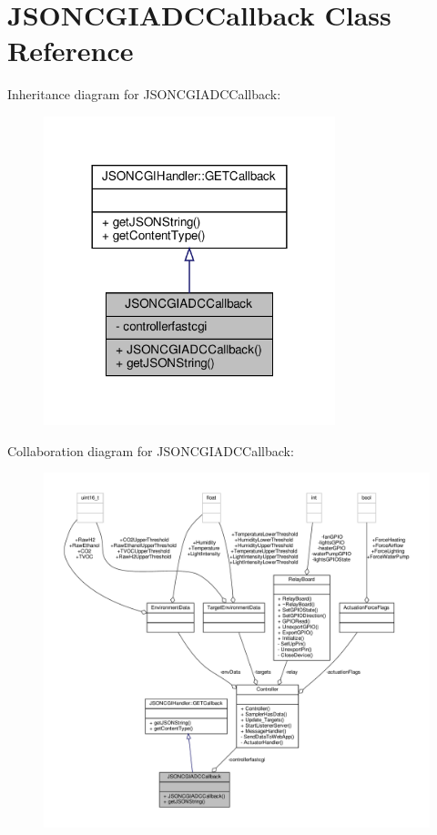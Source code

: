 \hypertarget{classJSONCGIADCCallback}{}\section{J\+S\+O\+N\+C\+G\+I\+A\+D\+C\+Callback Class Reference}
\label{classJSONCGIADCCallback}


Inheritance diagram for J\+S\+O\+N\+C\+G\+I\+A\+D\+C\+Callback\+:\nopagebreak
\begin{figure}[H]
\begin{center}
\leavevmode
\includegraphics[width=240pt]{classJSONCGIADCCallback__inherit__graph}
\end{center}
\end{figure}


Collaboration diagram for J\+S\+O\+N\+C\+G\+I\+A\+D\+C\+Callback\+:\nopagebreak
\begin{figure}[H]
\begin{center}
\leavevmode
\includegraphics[width=350pt]{classJSONCGIADCCallback__coll__graph}
\end{center}
\end{figure}
